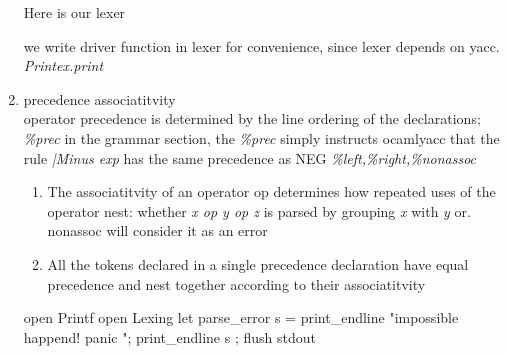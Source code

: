\begin{enumerate}
Here is our lexer

we write driver function in lexer for convenience, since lexer depends
on yacc. \textit{Printex.print}
\item precedence associatitvity \\
  operator precedence is determined by the line ordering of the
  declarations; 
  \textit{\%prec} in the grammar section, the \textit{\%prec} simply
  instructs ocamlyacc that the rule \textit{|Minus exp } has the same
  precedence as NEG
  \textit{\%left,\%right,\%nonassoc}
  \begin{enumerate}
  \item The associatitvity of an operator op determines how repeated
    uses of the operator nest: whether \textit{x op y op z} is parsed
    by grouping \textit{x} with \textit{y} or. nonassoc will consider
    it as an error
  \item All the tokens declared in a single precedence declaration
    have equal precedence and nest together according to their
    associatitvity
  \end{enumerate}

  
  \begin{bluetext}
  open Printf
  open Lexing 
  let parse_error s = 
    print_endline "impossible happend! panic \n";
    print_endline s ; 
    flush stdout 





\end{bluetext}
\end{enumerate}
